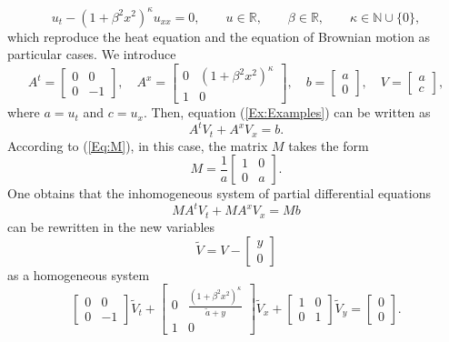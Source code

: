 \documentclass{birkjour}
\theoremstyle{definition}
\theoremstyle{remark}
\numberwithin{equation}{section}
\numberwithin{equation}{section}
\numberwithin{thm}{section}
\numberwithin{equation}{section}
\numberwithin{thm}{section}
\begin{document}
%
\begin{equation}\label{Ex:Examples}
	u_t-(1+\beta^2x^2)^\kappa u_{xx}=0,\qquad u\in \mathbb{R},\qquad \beta\in \mathbb{R},\qquad \kappa\in \mathbb{N}\cup\{0\},
\end{equation}
which reproduce the heat equation and the equation of Brownian motion as particular cases. 
We introduce
$$
A^t=\left[\begin{array}{cc}0&0\\0&-1\end{array}\right],\quad A^x=\left[\begin{array}{cc}0&(1+\beta^2x^2)^\kappa \\1&0\end{array}\right],\quad b=\left[\begin{array}{c}a\\0\end{array}\right],\quad V=\left[\begin{array}{c}a\\c\end{array}\right],
$$
where $a=u_t$ and $c=u_x$. Then, equation (\ref{Ex:Examples}) can be written as
$$
A^tV_t+A^xV_x=b.
$$
According to (\ref{Eq:M}), in this case, the matrix $M$ takes the form
$$
M=\frac{1}{a}\left[\begin{array}{cc}1&0\\0&a\end{array}\right].
$$
One obtains that  the inhomogeneous system of partial differential equations
$$
MA^tV_t+MA^xV_x=Mb
$$
can be rewritten in the new variables
$$
\widetilde{V}=V-\left[\begin{array}{c}y\\0
\end{array}\right]
$$
as a homogeneous system
\begin{equation}\label{Eq:P}
	\left[\begin{array}{cc}0&0\\0&-1\end{array}\right]\widetilde{V}_t+\left[\begin{array}{cc}0&\frac{(1+\beta^2x^2)^\kappa }{\widetilde{a}+y}\\1&0\end{array}\right]\widetilde{V}_x+\left[\begin{array}{cc}1&0\\0&1\end{array}\right]\widetilde{V}_{y}=\left[\begin{array}{c}0\\0\end{array}\right].
\end{equation}
\end{document}
